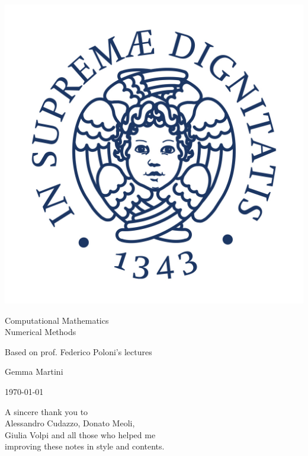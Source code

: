 \documentclass[ComputationalMathematics.tex]{subfiles}
\begin{document}
\begin{titlepage}
    \begin{center}
    \vspace{3cm}
    
    \Large
    
    \vspace{2cm}
    
    \includegraphics[scale=0.3]{pics/cherubino.jpg}
    
    \vspace{2.5cm}
    
    {\Huge \sc Computational Mathematics\\ Numerical Methods}
    
    \vspace{2cm}
    Based on prof. Federico Poloni's lectures
    
    \vspace{2cm}
    Gemma Martini
    \vfill
    
    \today
    
    \end{center}
\end{titlepage}


\phantom{pippo}
\vspace{5cm}
\begin{flushleft}
A sincere thank you to\\
Alessandro Cudazzo, Donato Meoli,\\
Giulia Volpi and all those who helped me\\
improving these notes in style and contents.\\
\end{flushleft}
\newpage
\end{document}
